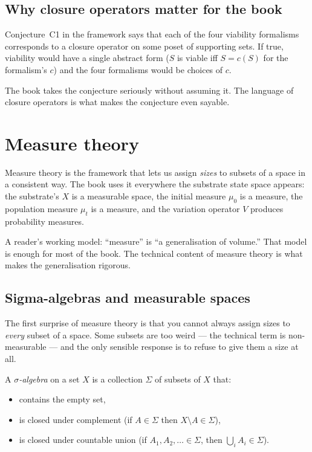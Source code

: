 \subsection*{Why closure operators matter for the book}

Conjecture~C1 in the framework says that each of the four viability
formalisms corresponds to a closure operator on some poset of
supporting sets. If true, viability would have a single abstract
form ($S$ is viable iff $S = c(S)$ for the formalism's $c$) and the
four formalisms would be choices of $c$.

The book takes the conjecture seriously without assuming it. The
language of closure operators is what makes the conjecture even
sayable.

\section{Measure theory}

Measure theory is the framework that lets us assign \emph{sizes} to
subsets of a space in a consistent way. The book uses it everywhere
the substrate state space appears: the substrate's $X$ is a
measurable space, the initial measure $\mu_0$ is a measure, the
population measure $\mu_t$ is a measure, and the variation operator
$V$ produces probability measures.

A reader's working model: ``measure'' is ``a generalisation of
volume.'' That model is enough for most of the book. The technical
content of measure theory is what makes the generalisation rigorous.

\subsection*{Sigma-algebras and measurable spaces}

The first surprise of measure theory is that you cannot always
assign sizes to \emph{every} subset of a space. Some subsets are too
weird --- the technical term is non-measurable --- and the only
sensible response is to refuse to give them a size at all.

A \emph{$\sigma$-algebra} on a set $X$ is a collection $\Sigma$ of
subsets of $X$ that:

\begin{itemize}[leftmargin=1.5em,itemsep=2pt]
  \item contains the empty set,
  \item is closed under complement (if $A \in \Sigma$ then $X
    \setminus A \in \Sigma$),
  \item is closed under countable union (if $A_1, A_2, \ldots \in
    \Sigma$, then $\bigcup_i A_i \in \Sigma$).
\end{itemize}

